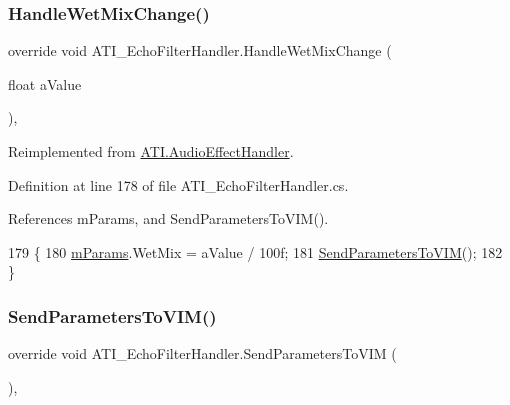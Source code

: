\subsubsection{\texorpdfstring{Handle\+Wet\+Mix\+Change()}{HandleWetMixChange()}}
{\footnotesize\ttfamily override void A\+T\+I\+\_\+\+Echo\+Filter\+Handler.\+Handle\+Wet\+Mix\+Change (\begin{DoxyParamCaption}\item[{float}]{a\+Value }\end{DoxyParamCaption})\hspace{0.3cm}{\ttfamily [protected]}, {\ttfamily [virtual]}}



Reimplemented from \hyperlink{class_a_t_i_1_1_audio_effect_handler_a630d6f0e674c531ad0c138181609a895}{A\+T\+I.\+Audio\+Effect\+Handler}.



Definition at line 178 of file A\+T\+I\+\_\+\+Echo\+Filter\+Handler.\+cs.



References m\+Params, and Send\+Parameters\+To\+V\+I\+M().


\begin{DoxyCode}
179     \{
180         \hyperlink{class_a_t_i___echo_filter_handler_afe435170679cf364951083e6f6ffab36}{mParams}.WetMix = aValue / 100f;
181         \hyperlink{class_a_t_i___echo_filter_handler_afacef95c6ac470707d2bd092031efac0}{SendParametersToVIM}();
182     \}
\end{DoxyCode}
\mbox{\label{class_a_t_i___echo_filter_handler_afacef95c6ac470707d2bd092031efac0}} 
\subsubsection{\texorpdfstring{Send\+Parameters\+To\+V\+I\+M()}{SendParametersToVIM()}}
{\footnotesize\ttfamily override void A\+T\+I\+\_\+\+Echo\+Filter\+Handler.\+Send\+Parameters\+To\+V\+IM (\begin{DoxyParamCaption}{ }\end{DoxyParamCaption})\hspace{0.3cm}{\ttfamily [protected]}, {\ttfamily [virtual]}}



